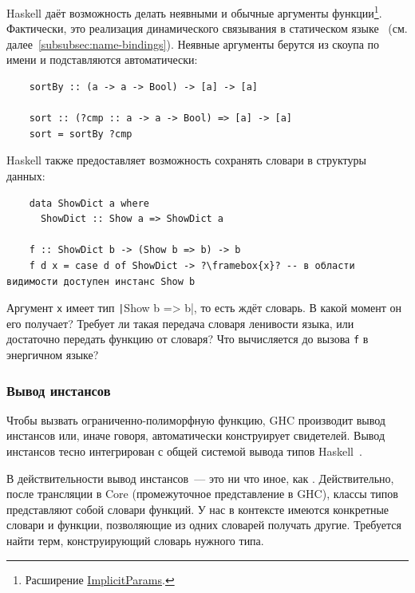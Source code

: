 Haskell даёт возможность делать неявными и обычные аргументы функции\footnote{Расширение \href{https://ghc.gitlab.haskell.org/ghc/doc/users_guide/exts/implicit_parameters.html}{ImplicitParams}.}.
Фактически, это реализация динамического связывания в статическом языке~\cite{lewis2000implicit} (см. далее\ \ref{subsubsec:name-bindings}).
Неявные аргументы берутся из скоупа по имени и подставляются автоматически:
\begin{verbatim}
    sortBy :: (a -> a -> Bool) -> [a] -> [a]

    sort :: (?cmp :: a -> a -> Bool) => [a] -> [a]
    sort = sortBy ?cmp
\end{verbatim}

Haskell также предоставляет возможность сохранять словари в структуры данных:
\begin{verbatim}
    data ShowDict a where
      ShowDict :: Show a => ShowDict a

    f :: ShowDict b -> (Show b => b) -> b
    f d x = case d of ShowDict -> ?\framebox{x}? -- в области видимости доступен инстанс Show b
\end{verbatim}

\begin{task}
    Аргумент \texttt{x} имеет тип \texttt|Show b => b|, то есть ждёт словарь.
    В какой момент он его получает?
    Требует ли такая передача словаря ленивости языка, или достаточно передать функцию от словаря?
    Что вычисляется до вызова \texttt{f} в энергичном языке?
\end{task}

\subsubsection{Вывод инстансов} \label{subsubsec:instance-inference}

Чтобы вызвать ограниченно-полиморфную функцию, GHC производит вывод инстансов или, иначе говоря, автоматически конструирует свидетелей.
Вывод инстансов тесно интегрирован с общей системой вывода типов Haskell~\cite{spj-type-inference}.

В действительности вывод инстансов~--- это ни что иное, как .
Действительно, после трансляции в Core (промежуточное представление в GHC), классы типов представляют собой словари функций.
У нас в контексте имеются конкретные словари и функции, позволяющие из одних словарей получать другие.
Требуется найти терм, конструирующий словарь нужного типа.

